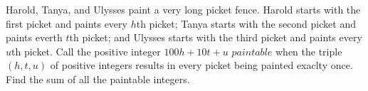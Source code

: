 Harold, Tanya, and Ulysses paint a very long picket fence.
Harold starts with the first picket and paints every $h$th picket;
Tanya starts with the second picket and paints everth $t$th picket; and
Ulysses starts with the third picket and paints every $u$th picket.
Call the positive integer $100h+10t+u$ $\textit{paintable}$ when the triple $(h,t,u)$ of positive integers results in every picket being painted exaclty once.  Find the sum of all the paintable integers.